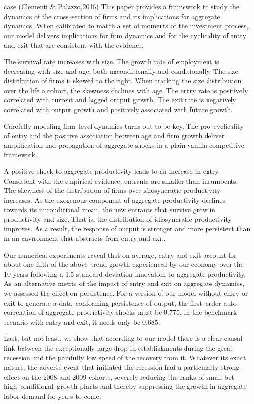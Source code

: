 \documentclass[
  12pt,
  oneside]{book}
\begin{document}
case (Clementi \& Palazzo,2016)
This paper provides a framework to study the dynamics of the cross--section of firms and its implications for aggregate dynamics. When calibrated to match a set of moments of the investment process, our model delivers implications for firm dynamics and for the cyclicality of entry and exit that are consistent with the evidence.

The survival rate increases with size. The growth rate of employment is decreasing with size and age, both unconditionally and conditionally. The size distribution of firms is skewed to the right. When tracking the size distribution over the life a cohort, the skewness declines with age. The entry rate is positively correlated with current and lagged output growth. The exit rate is negatively correlated with output growth and positively associated with future growth.

Carefully modeling firm--level dynamics turns out to be key. The pro--cyclicality of entry and the positive association between age and firm growth deliver amplification and propagation of aggregate shocks in a plain-vanilla competitive framework.

A positive shock to aggregate productivity leads to an increase in entry. Consistent with the empirical evidence, entrants are smaller than incumbents. The skewness of the distribution of firms over idiosyncratic productivity increases. As the exogenous component of aggregate productivity declines towards its unconditional mean, the new entrants that survive grow in productivity and size. That is, the distribution of idiosyncratic productivity improves. As a result, the response of output is stronger and more persistent than in an environment that abstracts from entry and exit.

Our numerical experiments reveal that on average, entry and exit account for about one fifth of the above--trend growth experienced by our economy over the 10 years following a 1.5 standard deviation innovation to aggregate productivity. As an alternative metric of the impact of entry and exit on aggregate dynamics, we assessed the effect on persistence. For a version of our model without entry or exit to generate a data--conforming persistence of output, the first--order auto correlation of aggregate productivity shocks must be 0.775. In the benchmark scenario with entry and exit, it needs only be 0.685.

Last, but not least, we show that according to our model there is a clear causal link between the exceptionally large drop in establishments during the great recession and the painfully low speed of the recovery from it. Whatever its exact nature, the adverse event that initiated the recession had a particularly strong effect on the 2008 and 2009 cohorts, severely reducing the ranks of small but high--conditional--growth plants and thereby suppressing the growth in aggregate labor demand for years to come.
\end{document}
